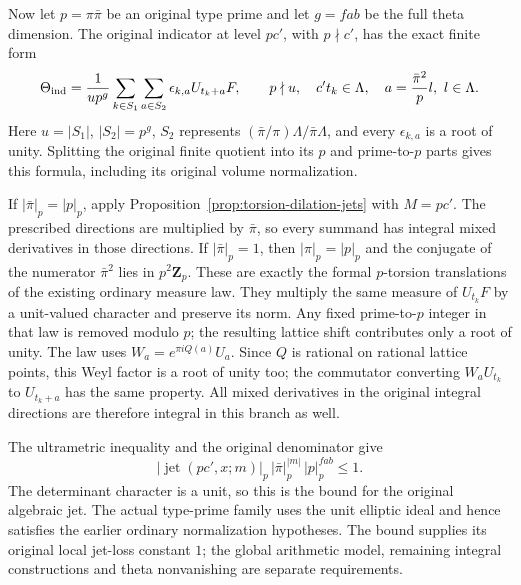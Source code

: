 Now let $p=\pi\bar\pi$ be an original type prime and let
$g=fab$ be the full theta dimension. The original indicator
at level $pc'$, with $p\nmid c'$, has the exact finite form
\[
 \Theta_{\rm ind}
 =\frac1{u p^g}
      \sum_{k\in S_1}\sum_{a\in S_2}
                    \epsilon_{k,a}U_{t_k+a}F,
 \qquad p\nmid u,\quad c't_k\in\Lambda,\quad
 a=\frac{\bar\pi^2}{p}l,\ l\in\Lambda.
\]
Here $u=|S_1|$, $|S_2|=p^g$,
$S_2$ represents
$(\bar\pi/\pi)\Lambda/\bar\pi\Lambda$, and every
$\epsilon_{k,a}$ is a root of unity. Splitting the original
finite quotient into its $p$ and prime-to-$p$ parts gives
this formula, including its original volume normalization.

If $|\bar\pi|_p=|p|_p$, apply
Proposition~\ref{prop:torsion-dilation-jets} with $M=pc'$.
The prescribed directions are multiplied by $\bar\pi$,
so every summand has integral mixed derivatives in those
directions. If $|\bar\pi|_p=1$, then $|\pi|_p=|p|_p$ and
the conjugate of the numerator $\bar\pi^2$ lies in
$p^2\mathbf Z_p$. These are exactly the formal
$p$-torsion translations of the existing ordinary measure
law. They multiply the same measure of $U_{t_k}F$ by a
unit-valued character and preserve its norm. Any fixed
prime-to-$p$ integer in that law is removed modulo $p$;
the resulting lattice shift contributes only a root of unity.
The law uses $W_a=e^{\pi iQ(a)}U_a$.
Since $Q$ is rational on rational lattice points, this Weyl
factor is a root of unity too; the commutator converting
$W_aU_{t_k}$ to $U_{t_k+a}$ has the same property.
All mixed derivatives in the original integral directions
are therefore integral in this branch as well.

The ultrametric inequality and the original denominator give
\[
 \boxed{\quad
   |\operatorname{jet}(pc',x;m)|_p\,
   |\bar\pi|_p^{|m|}\,|p|_p^{fab}\le1 .
 \quad}
\]
The determinant character is a unit, so this is the bound
for the original algebraic jet. The actual type-prime family
uses the unit elliptic ideal and hence satisfies the earlier
ordinary normalization hypotheses. The bound supplies its
original local jet-loss constant $1$; the global arithmetic
model, remaining integral constructions and theta
nonvanishing are separate requirements.
